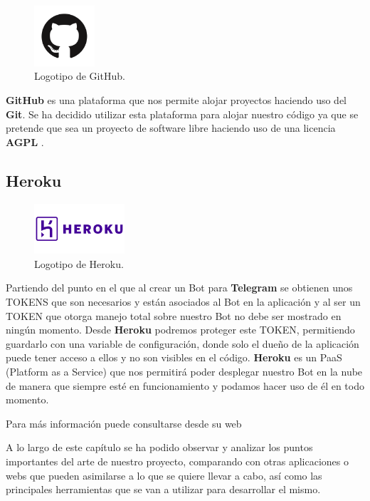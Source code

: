 \begin{figure}[H]
	\centering
	\includegraphics[width=0.2\textwidth]{img/github-icon}
	\caption{Logotipo de GitHub.}
\end{figure}

\textbf{GitHub} es una plataforma que nos permite alojar proyectos haciendo uso del \textbf{Git}. Se ha decidido utilizar esta plataforma para alojar nuestro código ya que se pretende que sea un proyecto de software libre haciendo uso de una licencia \textbf{AGPL} \cite{agplv3}.

\subsection{Heroku}

\begin{figure}[H]
	\centering
	\includegraphics[width=0.3\textwidth]{img/heroku-icon}
	\caption{Logotipo de Heroku.}
\end{figure}

Partiendo del punto en el que al crear un Bot para \textbf{Telegram} se obtienen unos TOKENS que son necesarios y están asociados al Bot en la aplicación y al ser un TOKEN que otorga manejo total sobre nuestro Bot no debe ser mostrado en ningún momento. Desde \textbf{Heroku} podremos proteger este TOKEN, permitiendo guardarlo con una variable de configuración, donde solo el dueño de la aplicación puede tener acceso a ellos y no son visibles en el código. \textbf{Heroku} es un PaaS (Platform as a Service) que nos permitirá poder desplegar nuestro Bot en la nube de manera que siempre esté en funcionamiento y podamos hacer uso de él en todo momento.

Para más información puede consultarse desde su web \cite{heroku}

A lo largo de este capítulo se ha podido observar y analizar los puntos importantes del arte de nuestro proyecto, comparando con otras aplicaciones o webs que pueden asimilarse a lo que se quiere llevar a cabo, así como las principales herramientas que se van a utilizar para desarrollar el mismo.